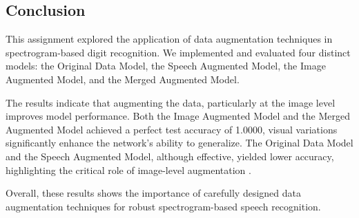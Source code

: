 \documentclass[a4paper,12pt]{article}
\begin{document}
\subsection{Conclusion}
This assignment explored the application of data augmentation techniques in spectrogram-based digit recognition. We implemented and evaluated four distinct models: the Original Data Model, the Speech Augmented Model, the Image Augmented Model, and the Merged Augmented Model. 

The results indicate that augmenting the data, particularly at the image level improves model performance. Both the Image Augmented Model and the Merged Augmented Model achieved a perfect test accuracy of 1.0000, visual variations significantly enhance the network's ability to generalize. The Original Data Model and the Speech Augmented Model, although effective, yielded lower accuracy, highlighting the critical role of image-level augmentation .

Overall, these results shows the importance of carefully designed data augmentation techniques for robust spectrogram-based speech recognition.
\end{document}
